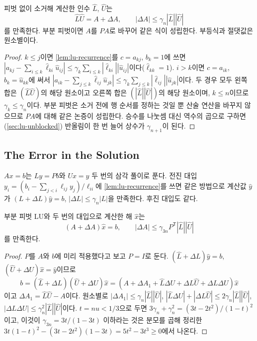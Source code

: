 \begin{theorem}[Wilkinson]
\label{thm:lu-backward}
피벗 없이 소거해 계산한 인수 $\hat L$, $\hat U$는
\[
\hat L\hat U=A+\Delta A,\qquad|\Delta A|\le\gamma_n|\hat L||\hat U|
\]
를 만족한다. 부분 피벗이면 $A$를 $PA$로 바꾸어 같은 식이 성립한다. 부등식과 절댓값은 원소별이다.
\end{theorem}

\begin{proof}
$k\le j$이면 \cref{lem:lu-recurrence}를 $c=a_{kj}$, $b_k=1$에 쓰면 $|a_{kj}-\sum_{i\le k}\hat\ell_{ki}\hat u_{ij}|\le\gamma_k\sum_{i\le k}|\hat\ell_{ki}||\hat u_{ij}|$이다($\hat\ell_{kk}=1$). $i>k$이면 $c=a_{ik}$, $b_k=\hat u_{kk}$에 써서 $|a_{ik}-\sum_{j\le k}\hat\ell_{ij}\hat u_{jk}|\le\gamma_k\sum_{j\le k}|\hat\ell_{ij}||\hat u_{jk}|$이다. 두 경우 모두 왼쪽 합은 $(\hat L\hat U)$의 해당 원소이고 오른쪽 합은 $(|\hat L||\hat U|)$의 해당 원소이며, $k\le n$이므로 $\gamma_k\le\gamma_n$이다. 부분 피벗은 소거 전에 행 순서를 정하는 것일 뿐 산술 연산을 바꾸지 않으므로 $PA$에 대해 같은 논증이 성립한다. 승수를 나눗셈 대신 역수의 곱으로 구하면(\cref{sec:lu-unblocked}) 반올림이 한 번 늘어 상수가 $\gamma_{n+1}$이 된다.
\end{proof}

\subsection{The Error in the Solution}

$Ax=b$는 $Ly=Pb$와 $Ux=y$ 두 번의 삼각 풀이로 푼다. 전진 대입 $y_i=(b_i-\sum_{j<i}\ell_{ij}y_j)/\ell_{ii}$에 \cref{lem:lu-recurrence}를 쓰면 같은 방법으로 계산값 $\hat y$가 $(L+\Delta L)\hat y=b$, $|\Delta L|\le\gamma_n|L|$을 만족한다. 후진 대입도 같다.

\begin{theorem}
\label{thm:lu-solve-backward}
부분 피벗 LU와 두 번의 대입으로 계산한 해 $\hat x$는
\[
(A+\Delta A)\hat x=b,\qquad|\Delta A|\le\gamma_{3n}P^{\mathsf T}|\hat L||\hat U|
\]
를 만족한다.
\end{theorem}

\begin{proof}
$P$를 $A$와 $b$에 미리 적용했다고 보고 $P=I$로 둔다. $(\hat L+\Delta L)\hat y=b$, $(\hat U+\Delta U)\hat x=\hat y$이므로
\[
b=(\hat L+\Delta L)(\hat U+\Delta U)\hat x=(A+\Delta A_1+\hat L\Delta U+\Delta L\hat U+\Delta L\Delta U)\hat x
\]
이고 $\Delta A_1=\hat L\hat U-A$이다. 원소별로 $|\Delta A_1|\le\gamma_n|\hat L||\hat U|$, $|\hat L\Delta U|+|\Delta L\hat U|\le2\gamma_n|\hat L||\hat U|$, $|\Delta L\Delta U|\le\gamma_n^2|\hat L||\hat U|$이다. $t=nu<1/3$으로 두면 $3\gamma_n+\gamma_n^2=(3t-2t^2)/(1-t)^2$이고, 이것이 $\gamma_{3n}=3t/(1-3t)$ 이하라는 것은 분모를 곱해 정리한 $3t(1-t)^2-(3t-2t^2)(1-3t)=5t^2-3t^3\ge0$에서 나온다.
\end{proof}

